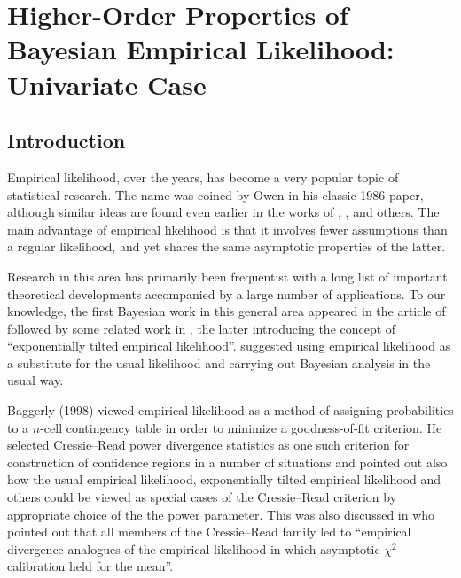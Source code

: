 \chapter{Higher-Order Properties of Bayesian Empirical Likelihood: Univariate
Case}
\section{Introduction}

Empirical likelihood, over the years, has become a very popular topic
of statistical research. The name was coined by Owen in his classic
1986 paper, although similar ideas are found even earlier in the works
of \cite{hartley1968new}%
, \cite{thomas1975confidence}%
, \cite{rubin1981bayesian} and others. The main advantage of empirical
likelihood is that it involves fewer assumptions than a regular likelihood,
and yet shares the same asymptotic properties of the latter. 

Research in this area has primarily been frequentist with a long list
of important theoretical developments accompanied by a large number
of applications. To our knowledge, the first Bayesian work in this
general area appeared in the article of \cite{lazar2003bayesian}
{} followed by some related work in \cite{schennach2005bayesian,schennach2007point}
, the latter introducing the concept of ``exponentially tilted empirical
likelihood''. \cite{lazar2003bayesian} suggested using empirical
likelihood as a substitute for the usual likelihood and carrying out
Bayesian analysis in the usual way. 

Baggerly (1998) \cite{baggerly1998empirical} viewed empirical likelihood as a method
of assigning probabilities to a $n$-cell contingency table in order
to minimize a goodness-of-fit criterion. He selected Cressie--Read
power divergence statistics as one such criterion for construction
of confidence regions in a number of situations and pointed out also
how the usual empirical likelihood, exponentially tilted empirical
likelihood and others could be viewed as special cases of the Cressie--Read
criterion by appropriate choice of the the power parameter. This was
also discussed in \cite{owen2010empirical} who pointed out that
all members of the Cressie--Read family led to ``empirical divergence
analogues of the empirical likelihood in which asymptotic $\chi^{2}$
calibration held for the mean''.

